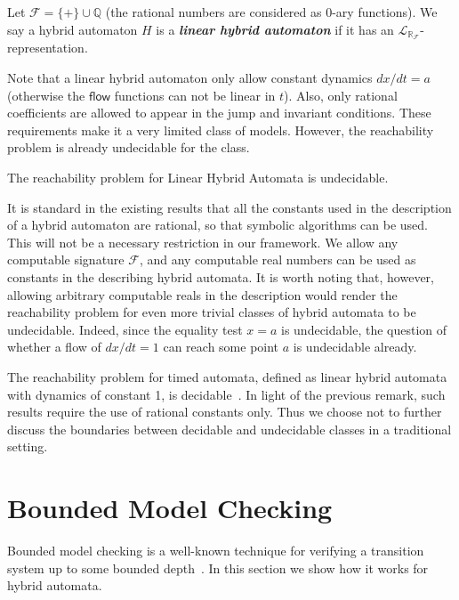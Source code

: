 \documentclass[envcountsect]{llncs}
\newcommand{\flow}{\mathsf{flow}}
\newcommand{\lrf}{\mathcal{L}_{\mathbb{R}_{\mathcal{F}}}}
\begin{document}
\begin{definition}
Let $\mathcal{F} = \{+\}\cup \mathbb{Q}$ (the rational numbers are considered as
 0-ary functions). We say a hybrid automaton $H$ is a {\bf\em linear hybrid
automaton} if it has an $\lrf$-representation. 
\end{definition}

Note that a linear hybrid automaton only allow constant dynamics $dx/dt = a$ 
(otherwise the $\flow$ functions can not be linear in $t$). Also, only rational
coefficients are allowed to appear in the jump and invariant conditions. These
requirements make it a very limited class of models. However, the reachability
problem is already undecidable for the class. 

\begin{proposition}
The reachability problem for Linear Hybrid Automata is undecidable. 
\end{proposition}

It is standard in the existing results that all the constants used in the 
description of a hybrid automaton are rational, so that symbolic algorithms can
be used. This will not be a necessary restriction in our framework. We allow any
computable signature $\mathcal{F}$, and any computable real numbers can be used
as constants in the describing hybrid automata. It is worth noting that,
however, allowing arbitrary computable reals in the description would render the
reachability problem for even more trivial classes of hybrid automata to be
undecidable. Indeed, since the equality test $x=a$ is undecidable, the question
of whether a flow of $dx/dt = 1$ can reach some point $a$ is undecidable
already.

\begin{remark}
The reachability problem for timed automata, defined as linear hybrid automata 
with dynamics of constant 1, is decidable~\cite{DBLP:conf/rex/AlurD91}. In light
of the previous remark, such results require the use of rational constants only.
Thus we choose not to further discuss the boundaries between decidable and
undecidable classes in a traditional setting. 
\end{remark}

\section{Bounded Model Checking}


Bounded model checking is a well-known technique for verifying a transition 
system up to some bounded depth~\cite{DBLP:journals/fmsd/ClarkeBRZ01}. In this
section we show how it works for hybrid automata. 
\end{document}
